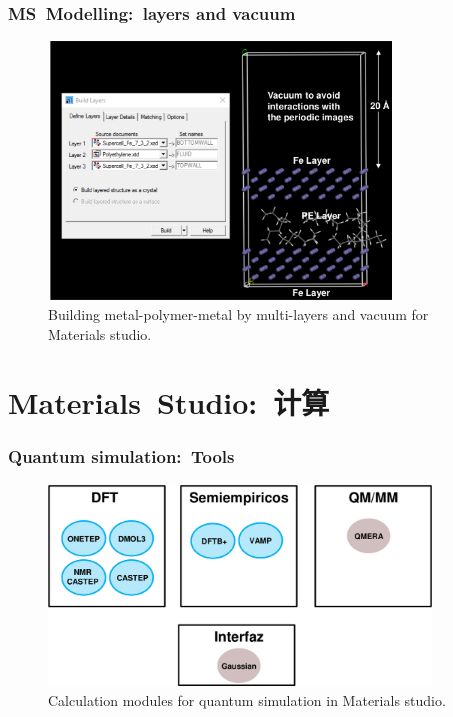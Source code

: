 \frame
{
	\frametitle{\textrm{MS~Modelling:~layers and vacuum}}
\begin{figure}[h!]
\centering
\vspace*{-0.18in}
\includegraphics[height=2.70in,width=3.60in,viewport=0 0 1006 763,clip]{Figures/MS-Building_layer.png}
\caption{\tiny \textrm{Building metal-polymer-metal by multi-layers and vacuum for Materials studio.}}%
\label{MS-Building_layer}
\end{figure}
}

\section{\rm{Materials~Studio}:~计算}
\frame
{
	\frametitle{\textrm{Quantum simulation:~Tools}}
\begin{figure}[h!]
\centering
\vspace*{-0.10in}
\includegraphics[height=2.10in,width=4.00in,viewport=0 0 1459 763,clip]{Figures/MS-Quantum_simulation-tools.png}
\caption{\tiny \textrm{Calculation modules for quantum simulation in Materials studio.}}%
\label{MS-Quantum_simulation}
\end{figure}
}

